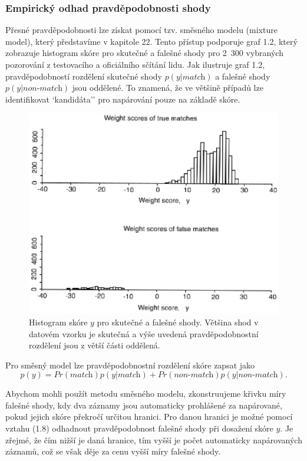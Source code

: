\subsubsection{Empirický odhad pravděpodobnosti shody}

Přesné pravděpodobnosti lze získat pomocí tzv. směsného modelu (mixture model), který představíme v kapitole 22. Tento přístup podporuje graf 1.2, který zobrazuje histogram skóre pro skutečné a falešné shody pro 2~300 vybraných pozorování z testovacího a oficiálního sčítání lidu. Jak ilustruje graf 1.2, pravděpodobností rozdělení skutečné shody $p(y|\textit{match})$ a falešné shody $p(y|\textit{non-match})$ jsou oddělené. To znamená, že ve většině případů lze identifikovat `kandidáta'' pro napárování pouze na základě skóre.

\begin{figure}[htp]
\centering
\includegraphics[scale = 0.65]{pictures/fig_1_3.eps}
\caption{Histogram skóre $y$ pro skutečné a falešné shody. Většina shod v datovém vzorku je skutečná a výše uvedená pravděpodobnostní rozdělení jsou z větší části oddělená.}
\label{fig_1_3}
\end{figure} 

Pro směsný model lze pravděpodobnostní rozdělení skóre zapsat jako
\begin{equation}
p(y) = Pr(\textit{match})p(y|\textit{match}) + Pr(\textit{non-match})p(y|\textit{non-match}).
\end{equation}

Abychom mohli použít metodu směsného modelu, zkonstruujeme křivku míry falešné shody, kdy dva záznamy jsou automaticky prohlášené za napárované, pokud jejich skóre překročí určitou hranici. Pro danou hranici je možné pomocí vztahu (1.8) odhadnout pravděpodobnost falešné shody při dosažení skóre $y$. Je zřejmé, že čím nižší je daná hranice, tím vyšší je počet automaticky napárovaných záznamů, což se však děje za cenu vyšší míry falešné shody.

